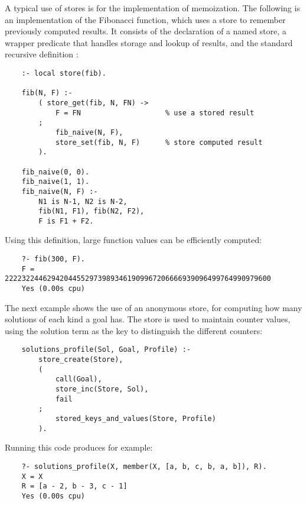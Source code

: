 A typical use of stores is for the implementation of memoization.
The following is an implementation of the Fibonacci function, which
uses a store to remember previously computed results.
It consists of the declaration of a named store, a wrapper predicate
 that handles storage and lookup of results, and the standard
recursive definition :
\begin{verbatim}
    :- local store(fib).

    fib(N, F) :-
        ( store_get(fib, N, FN) ->
            F = FN                    % use a stored result
        ;
            fib_naive(N, F),
            store_set(fib, N, F)      % store computed result
        ).

    fib_naive(0, 0).
    fib_naive(1, 1).
    fib_naive(N, F) :-
        N1 is N-1, N2 is N-2,
        fib(N1, F1), fib(N2, F2),
        F is F1 + F2.
\end{verbatim}
Using this definition, large function values can be efficiently computed:
\begin{verbatim}
    ?- fib(300, F).
    F = 222232244629420445529739893461909967206666939096499764990979600
    Yes (0.00s cpu)
\end{verbatim}



The next example shows the use of an anonymous store, for computing
how many solutions of each kind a goal has.
The store is used to maintain counter values, using the
solution term as the key to distinguish the different counters:
\begin{verbatim}
    solutions_profile(Sol, Goal, Profile) :-
        store_create(Store),
        (
            call(Goal),
            store_inc(Store, Sol),
            fail
        ;
            stored_keys_and_values(Store, Profile)
        ).
\end{verbatim}
Running this code produces for example:
\begin{verbatim}
    ?- solutions_profile(X, member(X, [a, b, c, b, a, b]), R).
    X = X
    R = [a - 2, b - 3, c - 1]
    Yes (0.00s cpu)
\end{verbatim}


